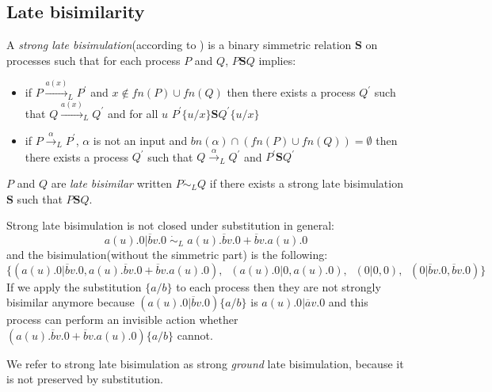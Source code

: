 \subsection{Late bisimilarity}

\begin{definition}
  A \emph{strong late bisimulation}(according to \cite{parrow}) is a binary simmetric relation $\mathbf{S}$ on processes such that for each process $P$ and $Q$, $P\mathbf{S}Q$ implies:
  \begin{itemize}
    \item
      if $P \xrightarrow{a(x)}_{L} P^{'}$ and $x\notin fn(P)\cup fn(Q)$ then there exists a process $Q^{'}$ such that $Q \xrightarrow{a(x)}_{L} Q^{'}$ and for all $u$ $P^{'}\{u/x\}\mathbf{S}Q^{'}\{u/x\}$
    \item 
      if $P \xrightarrow{\alpha}_{L} P^{'}$, $\alpha$ is not an input and $bn(\alpha) \cap (fn(P)\cup fn(Q)) = \emptyset$ then there exists a process $Q^{'}$ such that $Q \xrightarrow{\alpha}_{L} Q^{'}$ and $P^{'}\mathbf{S}Q^{'}$
  \end{itemize}
  $P$ and $Q$ are \emph{late bisimilar} written $P\dot{\sim}_{L}Q$ if there exists a strong late bisimulation $\mathbf{S}$ such that $P\mathbf{S}Q$.
\end{definition}

\begin{example}
  Strong late bisimulation is not closed under substitution in general:
  \[
    a(u).0|\overline{b}v.0\; \dot{\sim}_{L}\; a(u).\overline{b}v.0 + \overline{b}v.a(u).0
  \]
  and the bisimulation(without the simmetric part) is  the following:
  \[
    \{(a(u).0|\overline{b}v.0, a(u).\overline{b}v.0 + \overline{b}v.a(u).0),\;\; (a(u).0|0,a(u).0),\;\; (0|0,0),\;\; (0|\overline{b}v.0,\overline{b}v.0)\} 
  \]
  If we apply the substitution $\{a/b\}$ to each process then they are not strongly bisimilar anymore because $(a(u).0|\overline{b}v.0)\{a/b\}$ is $a(u).0|\overline{a}v.0$ and this process can perform an invisible action whether $(a(u).\overline{b}v.0 + \overline{b}v.a(u).0)\{a/b\}$ cannot.
\end{example}

We refer to strong late bisimulation as strong \emph{ground} late bisimulation, because it is not preserved by substitution.

